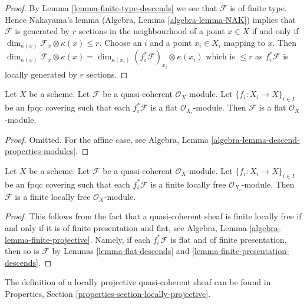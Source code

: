 \begin{proof}
By Lemma \ref{lemma-finite-type-descends} we see that $\mathcal{F}$
is of finite type. Hence Nakayama's lemma
(Algebra, Lemma \ref{algebra-lemma-NAK}) implies that $\mathcal{F}$
is generated by $r$ sections in the neighbourhood of a point $x \in X$
if and only if $\dim_{\kappa(x)} \mathcal{F}_x \otimes \kappa(x) \leq r$.
Choose an $i$ and a point $x_i \in X_i$ mapping to $x$. Then
$\dim_{\kappa(x)} \mathcal{F}_x \otimes \kappa(x) = 
\dim_{\kappa(x_i)} (f_i^*\mathcal{F})_{x_i} \otimes \kappa(x_i)$
which is $\leq r$ as $f_i^*\mathcal{F}$ is locally generated by $r$
sections.
\end{proof}

\begin{lemma}
\label{lemma-flat-descends}
Let $X$ be a scheme.
Let $\mathcal{F}$ be a quasi-coherent $\mathcal{O}_X$-module.
Let $\{f_i : X_i \to X\}_{i \in I}$ be an fpqc covering such that
each $f_i^*\mathcal{F}$ is a flat $\mathcal{O}_{X_i}$-module.
Then $\mathcal{F}$ is a flat $\mathcal{O}_X$-module.
\end{lemma}

\begin{proof}
Omitted. For the affine case, see
Algebra, Lemma \ref{algebra-lemma-descend-properties-modules}.
\end{proof}

\begin{lemma}
\label{lemma-finite-locally-free-descends}
Let $X$ be a scheme.
Let $\mathcal{F}$ be a quasi-coherent $\mathcal{O}_X$-module.
Let $\{f_i : X_i \to X\}_{i \in I}$ be an fpqc covering such that
each $f_i^*\mathcal{F}$ is a finite locally free $\mathcal{O}_{X_i}$-module.
Then $\mathcal{F}$ is a finite locally free $\mathcal{O}_X$-module.
\end{lemma}

\begin{proof}
This follows from the fact that a quasi-coherent sheaf is finite locally
free if and only if it is of finite presentation and flat, see
Algebra, Lemma \ref{algebra-lemma-finite-projective}.
Namely, if each $f_i^*\mathcal{F}$ is flat and of finite presentation,
then so is $\mathcal{F}$ by
Lemmas \ref{lemma-flat-descends} and
\ref{lemma-finite-presentation-descends}.
\end{proof}

\noindent
The definition of a locally projective quasi-coherent sheaf can be found in
Properties, Section \ref{properties-section-locally-projective}.

